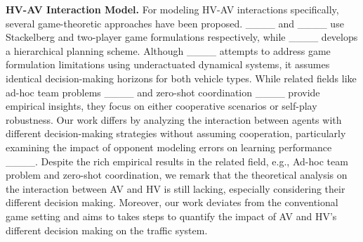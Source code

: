 
{\bf HV-AV Interaction Model.} For modeling HV-AV interactions specifically, several game-theoretic approaches have been proposed. ____ and ____ use Stackelberg and two-player game formulations respectively, while ____ develops a hierarchical planning scheme. Although ____ attempts to address game formulation limitations using underactuated dynamical systems, it assumes identical decision-making horizons for both vehicle types. While related fields like ad-hoc team problems ____ and zero-shot coordination ____ provide empirical insights, they focus on either cooperative scenarios or self-play robustness. Our work differs by analyzing the interaction between agents with different decision-making strategies without assuming cooperation, particularly examining the impact of opponent modeling errors on learning performance ____. Despite the rich empirical results in the related field, e.g., Ad-hoc team problem and zero-shot coordination, we remark that the theoretical analysis on the interaction between AV and HV is still lacking, especially considering their different decision making. Moreover, our work deviates from the conventional game setting and  aims to takes steps to quantify the impact of AV and HV's different decision making on the traffic system.  


